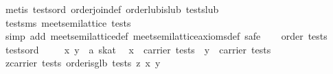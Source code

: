 \begin{isabellebody}
\isamarkupfalse%
\ {}metis\ tests{}ord\ order{}join{}def\ order{}lub{}is{}lub\ tests{}lub{}%
\endisatagproof
{\isafoldproof}%
%
\isadelimproof
\isanewline
%
\endisadelimproof
\isanewline
{}\isamarkupfalse%
\ tests{}ms{}\ {}meet{}semilattice\ tests{}\isanewline
%
\isadelimproof
%
\endisadelimproof
%
\isatagproof
{}\isamarkupfalse%
\ {}simp\ add{}\ meet{}semilattice{}def\ meet{}semilattice{}axioms{}def{}\ safe{}\isanewline
\ \ \isamarkupfalse%
\ {}order\ tests{}\ \isamarkupfalse%
\ tests{}ord\ \isamarkupfalse%
\isanewline
\isanewline
\ \ \isamarkupfalse%
\ x\ y\ {}{}\ {}{}a\ skat{}\ \isamarkupfalse%
\ {}x\ {}\ carrier\ tests{}\ \ {}y\ {}\ carrier\ tests{}\isanewline
\ \ \isamarkupfalse%
\ {}{}z{}carrier\ tests{}\ order{}is{}glb\ tests\ z\ {}x{}\ y{}{}\isanewline

\end{isabellebody}
